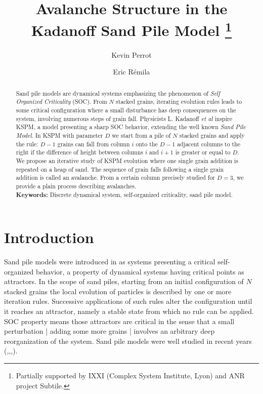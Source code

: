 \documentclass[11pt,a4paper]{llncs}
\title{Avalanche Structure in the Kadanoff Sand Pile Model
\thanks{Partially supported by  IXXI (Complex System Institute, Lyon) and ANR project  Subtile. }}
\author{Kevin Perrot \and Eric R\'emila}
\institute{Universit\'e  de Lyon\\
  Laboratoire de l'Informatique du Parall\'elisme, \\
  (umr 5668 CNRS - ENS Lyon - Universit\'e  Lyon 1),\\
46 all\'ee d'Italie 69364 Lyon Cedex 7 - France,\\
\email{\{kevin.perrot,eric.remila\}@ens-lyon.fr }}
\begin{document}
\maketitle

\begin{abstract}
  Sand pile models are dynamical systems emphasizing the phenomenon of {\em Self Organized Criticality} (SOC). From $N$ stacked grains, iterating evolution rules leads to some critical configuration where a small disturbance has deep consequences on the system, involving numerous steps of grain fall. Physicists L. Kadanoff {\em et al} inspire KSPM, a model presenting a sharp SOC behavior, extending the well known {\em Sand Pile Model}. In KSPM with parameter $D$ we start from a pile of $N$ stacked grains and apply the rule: $D\!-\!1$ grains can fall from column $i$ onto the $D\!-\!1$ adjacent columns to the right if the difference of height between columns $i$ and $i\!+\!1$ is greater or equal to $D$. We propose an iterative study of KSPM evolution where one single grain addition is repeated on a heap of sand. The sequence of grain falls following a single grain addition is called an avalanche. From a certain column precisely studied for $D=3$, we provide a plain process describing avalanches.\\
  
\textbf{Keywords:} Discrete dynamical system, self-organized criticality, sand pile model.

\end{abstract}

\section{Introduction}

Sand pile models were introduced in \cite{bak88} as systems presenting a critical self-organized behavior, a property of dynamical systems having critical points as attractors. In the scope of sand piles, starting from an initial configuration of $N$ stacked grains the local evolution of particles is described by one or more iteration rules. Successive applications of such rules alter the configuration until it reaches an attractor, namely a stable state from which no rule can be applied. SOC property means those attractors are critical in the sense that a small perturbation | adding some more grains | involves an arbitrary deep reorganization of the system. Sand pile models were well studied in recent years (\cite{goles93},\cite{durandlose98},\cite{formenti07},\cite{phan08}).
\end{document}

